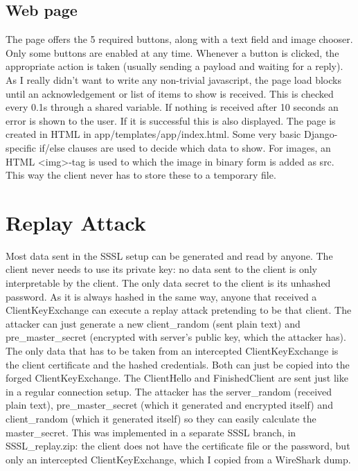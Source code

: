 \documentclass{article}
\begin{document}
\subsection{Web page}
The page offers the 5 required buttons, along with a text field and image chooser. Only some buttons are enabled at any time. Whenever a button is clicked, the appropriate action is taken (usually sending a payload and waiting for a reply). As I really didn't want to write any non-trivial javascript, the page load blocks until an acknowledgement or list of items to show is received. This is checked every 0.1s through a shared variable. If nothing is received after 10 seconds an error is shown to the user. If it is successful this is also displayed.
The page is created in HTML in app/templates/app/index.html. Some very basic Django-specific if/else clauses are used to decide which data to show. For images, an HTML \textless img\textgreater-tag is used to which the image in binary form is added as src. This way the client never has to store these to a temporary file.


\section{Replay Attack}
Most data sent in the SSSL setup can be generated and read by anyone. The client never needs to use its private key: no data sent to the client is only interpretable by the client. The only data secret to the client is its unhashed password. As it is always hashed in the same way, anyone that received a ClientKeyExchange can execute a replay attack pretending to be that client. The attacker can just generate a new client\_random (sent plain text) and pre\_master\_secret (encrypted with server's public key, which the attacker has). The only data that has to be taken from an intercepted ClientKeyExchange is the client certificate and the hashed credentials. Both can just be copied into the forged ClientKeyExchange. The ClientHello and FinishedClient are sent just like in a regular connection setup. The attacker has the server\_random (received plain text), pre\_master\_secret (which it generated and encrypted itself) and client\_random (which it generated itself) so they can easily calculate the master\_secret. This was implemented in a separate SSSL branch, in SSSL\_replay.zip: the client does not have the certificate file or the password, but only an intercepted ClientKeyExchange, which I copied from a WireShark dump. \\ \\
\end{document}
